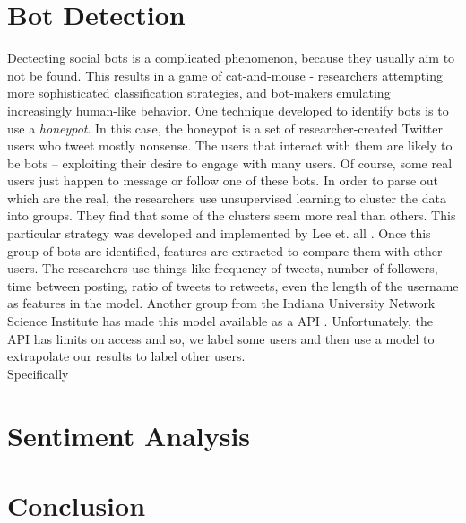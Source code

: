 \documentclass[10pt,a4paper]{article} %
\begin{document}
	\section{Bot Detection} 
		Dectecting social bots is a complicated phenomenon, because they usually aim to not be found.  This results in a game of cat-and-mouse - researchers attempting more sophisticated classification strategies, and bot-makers emulating increasingly human-like behavior.  One technique developed to identify bots is to use a \textit{honeypot}.  In this case, the honeypot is a set of researcher-created Twitter users who tweet mostly nonsense.  The users that interact with them are likely to be bots -- exploiting their desire to engage with many users.  Of course, some real users just happen to message or follow one of these bots.  In order to parse out which are the real, the researchers use unsupervised learning to cluster the data into groups.  They find that some of the clusters seem more real than others.  This particular strategy was developed and implemented by Lee et. all \cite{}.  Once this group of bots are identified, features are extracted to compare them with other users.  The researchers use things like frequency of tweets, number of followers, time between posting, ratio of tweets to retweets, even the length of the username as features in the model.  Another group from the Indiana University Network Science Institute has made this model available as a API \cite{DavisVFFM16}.  Unfortunately, the API has limits on access and so, we label some users and then use a model to extrapolate our results to label other users. \\
		
		\noindent Specifically
	\section{Sentiment Analysis}
	
	\section{Conclusion}
	
	\nocite{*}
	
	
\end{document}
